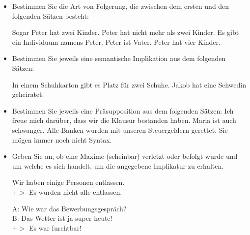 \begin{frame}

\begin{itemize}
	\item Bestimmen Sie die Art von Folgerung, die zwischen dem ersten und den folgenden Sätzen besteht:
	
	\ea Sogar Peter hat zwei Kinder. 
	\ea Peter hat nicht mehr als zwei Kinder.
	\ex Es gibt ein Individuum namens Peter.
	\ex Peter ist Vater.
	\ex Peter hat vier Kinder.
	\z
	\z 
	
	\item Bestimmen Sie jeweils eine semantische Implikation aus dem folgenden Sätzen:
	
	\eal
	\ex In einem Schuhkarton gibt es Platz für zwei Schuhe.
	\ex Jakob hat eine Schwedin geheiratet.
	\zl
		
\end{itemize}

\end{frame}


\begin{frame}

\begin{itemize}
	
	\item Bestimmen Sie jeweils eine Präsupposition aus dem folgenden Sätzen:
	\eal
	\ex Ich freue mich darüber, dass wir die Klausur bestanden haben.
	\ex Maria ist auch schwanger.
	\ex Alle Banken wurden mit unseren Steuergeldern gerettet.
	\ex Sie mögen immer noch nicht Syntax.
	\zl

	\item Geben Sie an, ob eine Maxime (scheinbar) verletzt oder befolgt wurde und um welche es sich handelt, um die angegebene Implikatur zu erhalten.
	
	\ea Wir haben einige Personen entlassen.\\
	$+>$ Es wurden nicht alle entlassen.
	\z
	
	\ea A: Wie war das Bewerbungsgespräch?\\
	B: Das Wetter ist ja super heute!\\
	$+>$ Es war furchtbar!
	\z
		
\end{itemize}

\end{frame}

